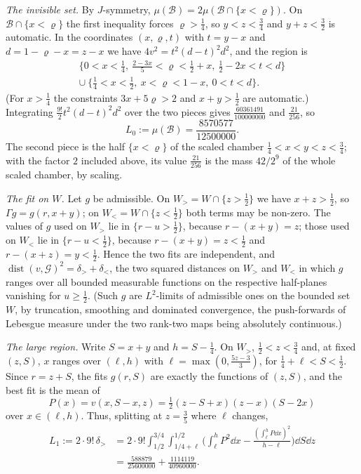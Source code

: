 \documentclass[11pt,colorlinks]{charlie}
\begin{document}
\emph{The invisible set.} By $J$-symmetry, $\mu(\mathcal B)=2\mu(\mathcal B\cap\{x<\varrho\})$. On $\mathcal B\cap\{x<\varrho\}$ the first inequality forces $\varrho>\frac14$, so $y<z<\frac34$ and $y+z<\frac32$ is automatic. In the coordinates $(x,\varrho,t)$ with $t=y-x$ and $d=1-\varrho-x=z-x$ we have $4v^2=t^2(d-t)^2d^2$, and the region is
\begin{gather*}
 \{0<x<\tfrac14,\ \tfrac{2-3x}5<\varrho<\tfrac12+x,\ \tfrac12-2x<t<d\}\\ \cup\ \{\tfrac14<x<\tfrac12,\ x<\varrho<1-x,\ 0<t<d\}.
\end{gather*}
(For $x>\frac14$ the constraints $3x+5\varrho>2$ and $x+y>\frac12$ are automatic.) Integrating $\frac{9!}2t^2(d-t)^2d^2$ over the two pieces gives $\frac{60361491}{100000000}$ and $\frac{21}{256}$, so
\begin{equation}\label{eq:L0}
 L_0:=\mu(\mathcal B)=\frac{8570577}{12500000}.
\end{equation}
The second piece is the half $\{x<\varrho\}$ of the scaled chamber $\frac14<x<y<z<\frac34$; with the factor $2$ included above, its value $\frac{21}{256}$ is the mass $42/2^9$ of the whole scaled chamber, by scaling.

\emph{The fit on $W$.} Let $g$ be admissible. On $W_>=W\cap\{z>\frac12\}$ we have $x+z>\frac12$, so $\Gamma g=g(r,x+y)$; on $W_<=W\cap\{z<\frac12\}$ both terms may be non-zero. The values of $g$ used on $W_>$ lie in $\{r-u>\frac12\}$, because $r-(x+y)=z$; those used on $W_<$ lie in $\{r-u<\frac12\}$, because $r-(x+y)=z<\frac12$ and $r-(x+z)=y<\frac12$. Hence the two fits are independent, and $\operatorname{dist}(v,\mathcal G)^2=\delta_>+\delta_<$, the two squared distances on $W_>$ and $W_<$ in which $g$ ranges over all bounded measurable functions on the respective half-planes vanishing for $u\ge\frac12$. (Such $g$ are $L^2$-limits of admissible ones on the bounded set $W$, by truncation, smoothing and dominated convergence, the push-forwards of Lebesgue measure under the two rank-two maps being absolutely continuous.)

\emph{The large region.} Write $S=x+y$ and $h=S-\frac14$. On $W_>$, $\frac12<z<\frac34$ and, at fixed $(z,S)$, $x$ ranges over $(\ell,h)$ with $\ell=\max(0,\frac{5z-3}3)$, for $\frac14+\ell<S<\frac12$. Since $r=z+S$, the fits $g(r,S)$ are exactly the functions of $(z,S)$, and the best fit is the mean of
\[
 P(x)=v(x,S-x,z)=\tfrac12(z-S+x)(z-x)(S-2x)
\]
over $x\in(\ell,h)$. Thus, splitting at $z=\frac35$ where $\ell$ changes,
\begin{equation}\label{eq:L1}
\begin{split}
 L_1:=2\cdot9!\,\delta_>&=2\cdot9!\int_{1/2}^{3/4}\int_{1/4+\ell}^{1/2}\Big(\int_\ell^hP^2\dd x-\frac{(\int_\ell^hP\dd x)^2}{h-\ell}\Big)\dd S\dd z\\
 &=\frac{588879}{25600000}+\frac{1114119}{40960000}.
\end{split}
\end{equation}
\end{document}
